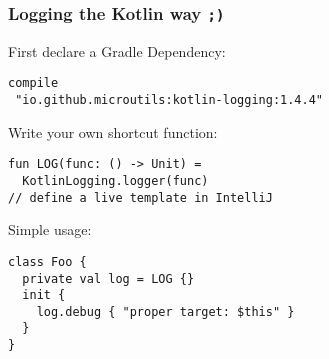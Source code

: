 




\begin{frame}[fragile] \frametitle{Logging the Kotlin way \texttt{;)}}

First declare a Gradle Dependency:
\begin{lstlisting}
compile
 "io.github.microutils:kotlin-logging:1.4.4"
\end{lstlisting}
\pause

Write your own shortcut function:
\begin{lstlisting}
fun LOG(func: () -> Unit) =
  KotlinLogging.logger(func)
// define a live template in IntelliJ
\end{lstlisting}
\pause

Simple usage:
\begin{lstlisting}
class Foo {
  private val log = LOG {}
  init {
    log.debug { "proper target: $this" }
  }
}
\end{lstlisting}
\pause

\end{frame}
